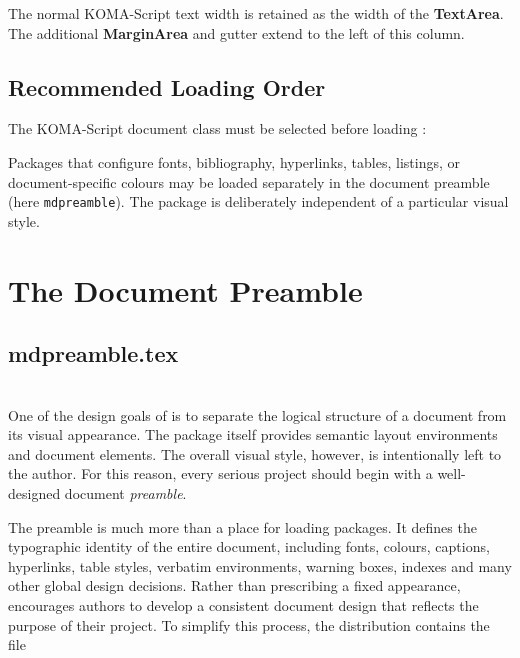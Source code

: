 \documentclass[
11pt,
a4paper,
oneside
]{scrbook}
\begin{document}


The normal KOMA-Script text width is retained as the width of the
\textbf{TextArea}.
The additional \textbf{MarginArea} and gutter extend to the left of this
column.

\section{Recommended Loading Order}

The KOMA-Script document class must be selected before loading
\MDWordmark:




Packages that configure fonts, bibliography, hyperlinks, tables, listings,
or document-specific colours may be loaded separately in the document
preamble (here \texttt{mdpreamble}). 
The package is deliberately independent of a particular visual style.


\chapter{The Document Preamble}
\section{mdpreamble.tex}
\\
One of the design goals of \MDWordmark is to separate the logical
structure of a document from its visual appearance.
The package itself provides semantic layout environments and document
elements. The overall visual style, however, is intentionally left to the
author.
For this reason, every serious \MDWordmark project should begin with
a well-designed document \emph{preamble}.

The preamble is much more than a place for loading packages. It defines
the typographic identity of the entire document, including fonts,
colours, captions, hyperlinks, table styles, verbatim environments,
warning boxes, indexes and many other global design decisions.
Rather than prescribing a fixed appearance, \MDWordmark encourages
authors to develop a consistent document design that reflects the purpose
of their project.
To simplify this process, the distribution contains the file


\end{document}
